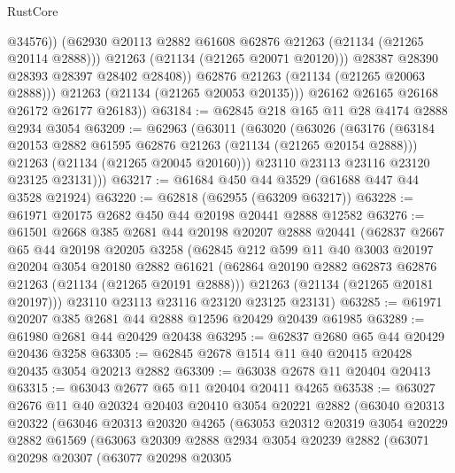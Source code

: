 \begin{lexlean}{RustCore}
\begin{coremodule}
                      @34576))
                  (@62930 @20113 @2882 @61608 @62876 @21263 (@21134 (@21265 @20114 @2888)))
                  @21263
                  (@21134 (@21265 @20071 @20120)))
                @28387
                @28390
                @28393
                @28397
                @28402
                @28408))
            @62876
            @21263
            (@21134 (@21265 @20063 @2888)))
          @21263
          (@21134 (@21265 @20053 @20135)))
        @26162
        @26165
        @26168
        @26172
        @26177
        @26183))
@63184 := @62845 @218 @165 @11 @28 @4174 @2888 @2934 @3054
@63209 := @62963
    (@63011
      (@63020
        (@63026
          (@63176
            (@63184 @20153 @2882 @61595 @62876 @21263 (@21134 (@21265 @20154 @2888)))
            @21263
            (@21134 (@21265 @20045 @20160)))
          @23110
          @23113
          @23116
          @23120
          @23125
          @23131)))
@63217 := @61684 @450 @44 @3529 (@61688 @447 @44 @3528 @21924)
@63220 := @62818 (@62955 (@63209 @63217))
@63228 := @61971 @20175 @2682 @450 @44 @20198 @20441 @2888 @12582
@63276 := @61501
    @2668
    @385
    @2681
    @44
    @20198
    @20207
    @2888
    @20441
    (@62837
      @2667
      @65
      @44
      @20198
      @20205
      @3258
      (@62845
        @212
        @599
        @11
        @40
        @3003
        @20197
        @20204
        @3054
        @20180
        @2882
        @61621
        (@62864 @20190 @2882 @62873 @62876 @21263 (@21134 (@21265 @20191 @2888)))
        @21263
        (@21134 (@21265 @20181 @20197)))
      @23110
      @23113
      @23116
      @23120
      @23125
      @23131)
@63285 := @61971 @20207 @385 @2681 @44 @2888 @12596 @20429 @20439 @61985
@63289 := @61980 @2681 @44 @20429 @20438
@63295 := @62837 @2680 @65 @44 @20429 @20436 @3258
@63305 := @62845 @2678 @1514 @11 @40 @20415 @20428 @20435 @3054 @20213 @2882
@63309 := @63038 @2678 @11 @20404 @20413
@63315 := @63043 @2677 @65 @11 @20404 @20411 @4265
@63538 := @63027
    @2676
    @11
    @40
    @20324
    @20403
    @20410
    @3054
    @20221
    @2882
    (@63040
      @20313
      @20322
      (@63046
        @20313
        @20320
        @4265
        (@63053
          @20312
          @20319
          @3054
          @20229
          @2882
          @61569
          (@63063
            @20309
            @2888
            @2934
            @3054
            @20239
            @2882
            (@63071
              @20298
              @20307
              (@63077
                @20298
                @20305

\end{coremodule}
\end{lexlean}

